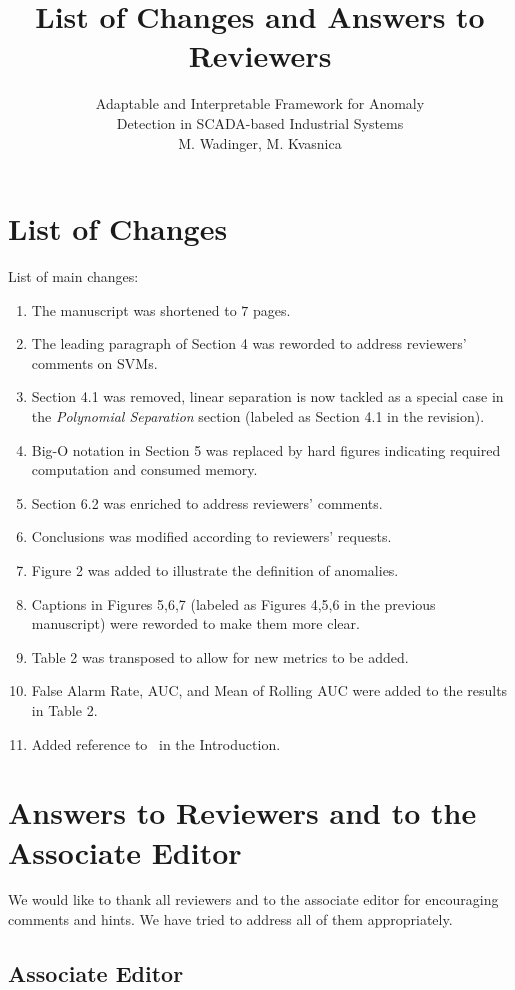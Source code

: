 \documentclass{article}
\title{List of Changes and Answers to Reviewers}
\author{Adaptable and Interpretable Framework for Anomaly\\Detection in SCADA-based Industrial Systems
  \\M. Wadinger, M. Kvasnica}
\begin{document}
\maketitle


\section{List of Changes}

List of main changes:
\begin{enumerate}

  \item The manuscript was shortened to $7$ pages.
  \item The leading paragraph of Section 4 was reworded to address
        reviewers' comments on SVMs.
  \item Section 4.1 was removed, linear separation is now tackled as a
        special case in the {\em Polynomial Separation} section (labeled as
        Section 4.1 in the revision).
  \item Big-O notation in Section 5 was replaced by hard figures
        indicating required computation and consumed memory.
  \item Section 6.2 was enriched to address reviewers' comments.
  \item Conclusions was modified according to reviewers' requests.
  \item Figure 2 was added to illustrate the definition of anomalies.
  \item Captions in Figures 5,6,7 (labeled as Figures 4,5,6 in the previous manuscript) were reworded to make them more clear.
  \item Table 2 was transposed to allow for new metrics to be added.
  \item False Alarm Rate, AUC, and Mean of Rolling AUC were added to the results in Table 2.
  \item Added reference to~\cite{Deldari2021} in the Introduction.
\end{enumerate}

\section{Answers to Reviewers and to the Associate Editor}

We would like to thank all reviewers and to the associate editor for
encouraging comments and hints. We have tried to address all of them
appropriately.

\subsection*{Associate Editor}
\end{document}
